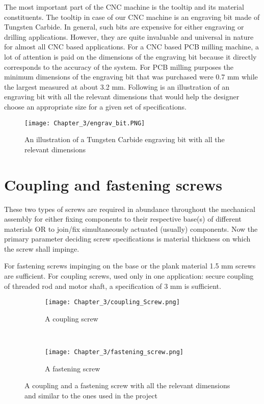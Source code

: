 The most important part of the CNC machine is the tooltip and its material constituents. The tooltip in case of our CNC machine is an engraving bit made of Tungsten Carbide. In general, such bits are expensive for either engraving or drilling applications. However, they are quite invaluable and universal in nature for almost all CNC based applications. For a CNC based PCB milling machine, a lot of attention is paid on the dimensions of the engraving bit because it directly corresponds to the accuracy of the system. For PCB milling purposes the minimum dimensions of the engraving bit that was purchased were 0.7 mm while the largest measured at about 3.2 mm. Following is an illustration of an engraving bit with all the relevant dimensions that would help the designer choose an appropriate size for a given set of specifications. 

\begin{figure}[h]
    \centering
    \texttt{[image: Chapter\_3/engrav\_bit.PNG]}
    \caption{An illustration of a Tungsten Carbide engraving bit with all the relevant dimensions}
    \label{fig:ebit}
\end{figure}

\section{Coupling and fastening screws} \label{screws}
These two types of screws are required in abundance throughout the mechanical assembly for either fixing components to their respective base(s) of different materials OR to join/fix simultaneously actuated (usually) components. Now the primary parameter deciding screw specifications is material thickness on which the screw shall impinge. \par

For fastening screws impinging on the base or the plank material 1.5 mm screws are sufficient. For coupling screws, used only in one application: secure coupling of threaded rod and motor shaft, a specification of 3 mm is sufficient.

\begin{figure}[h]
\begin{center}
 \begin{subfigure}{0.5\textwidth}
 \hspace{-12mm}
  \texttt{[image: Chapter\_3/coupling\_Screw.png]}
  \caption{A coupling screw} 
  \label{fig:cscrew}
 \end{subfigure} \\
 \end{center}
 \begin{center}
 \begin{subfigure}{0.5\textwidth}
  \texttt{[image: Chapter\_3/fastening\_screw.png]}
  \caption{A fastening screw}
  \label{fig:fscrew}
 \end{subfigure} 
\end{center}

 \caption{A coupling and a fastening screw with all the relevant dimensions and similar to the ones used in the project}
 \label{fig:cfscrews}
\end{figure}

